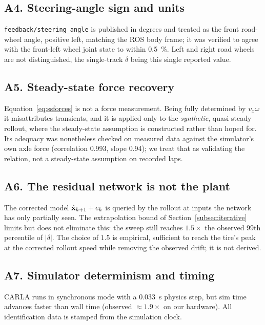 \subsection*{A4. Steering-angle sign and units}
\texttt{feedback/\allowbreak steering\_angle} is published in degrees and treated as
the front road-wheel angle, positive left, matching the ROS body frame; it was
verified to agree with the front-left wheel joint state to within
\SI{0.5}{\percent}. Left and right road wheels are not distinguished, the
single-track $\delta$ being this single reported value.

\subsection*{A5. Steady-state force recovery}
Equation~\eqref{eq:ssforces} is not a force measurement. Being fully determined
by $v_{x}\omega$ it misattributes transients, and it is applied only to the
\emph{synthetic}, quasi-steady rollout, where the steady-state assumption is
constructed rather than hoped for. Its adequacy was nonetheless checked on
measured data against the simulator's own axle force (correlation \num{0.993},
slope \num{0.94}); we treat that as validating the relation, not a steady-state
assumption on recorded laps.

\subsection*{A6. The residual network is not the plant}
The corrected model $\hat{\mathbf{x}}_{k+1}+e_{k}$ is queried by the rollout at
inputs the network has only partially seen. The extrapolation bound of
Section~\ref{subsec:iterative} limits but does not eliminate this: the sweep
still reaches $1.5\times$ the observed 99th percentile of $|\delta|$. The
choice of $1.5$ is empirical, sufficient to reach the tire's peak at the
corrected rollout speed while removing the observed drift; it is not derived.

\subsection*{A7. Simulator determinism and timing}
CARLA runs in synchronous mode with a \SI{0.033}{\second} physics step, but
sim time advances faster than wall time (observed $\approx1.9\times$ on our
hardware). All identification data is stamped from the simulation clock.

